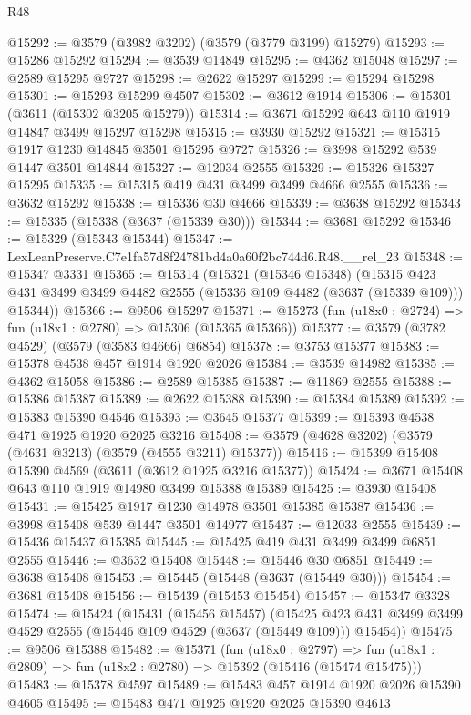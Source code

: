 \begin{lexlean}{R48}
\begin{coremodule}
@15292 := @3579 (@3982 @3202) (@3579 (@3779 @3199) @15279)
@15293 := @15286 @15292
@15294 := @3539 @14849
@15295 := @4362 @15048
@15297 := @2589 @15295 @9727
@15298 := @2622 @15297
@15299 := @15294 @15298
@15301 := @15293 @15299 @4507
@15302 := @3612 @1914
@15306 := @15301 (@3611 (@15302 @3205 @15279))
@15314 := @3671 @15292 @643 @110 @1919 @14847 @3499 @15297 @15298
@15315 := @3930 @15292
@15321 := @15315 @1917 @1230 @14845 @3501 @15295 @9727
@15326 := @3998 @15292 @539 @1447 @3501 @14844
@15327 := @12034 @2555
@15329 := @15326 @15327 @15295
@15335 := @15315 @419 @431 @3499 @3499 @4666 @2555
@15336 := @3632 @15292
@15338 := @15336 @30 @4666
@15339 := @3638 @15292
@15343 := @15335 (@15338 (@3637 (@15339 @30)))
@15344 := @3681 @15292
@15346 := @15329 (@15343 @15344)
@15347 := LexLeanPreserve.C7e1fa57d8f24781bd4a0a60f2bc744d6.R48.__rel_23
@15348 := @15347 @3331
@15365 := @15314
    (@15321
      (@15346 @15348)
      (@15315 @423 @431 @3499 @3499 @4482 @2555 (@15336 @109 @4482 (@3637 (@15339 @109))) @15344))
@15366 := @9506 @15297
@15371 := @15273 (fun (u18x0 : @2724) => fun (u18x1 : @2780) => @15306 (@15365 @15366))
@15377 := @3579 (@3782 @4529) (@3579 (@3583 @4666) @6854)
@15378 := @3753 @15377
@15383 := @15378 @4538 @457 @1914 @1920 @2026
@15384 := @3539 @14982
@15385 := @4362 @15058
@15386 := @2589 @15385
@15387 := @11869 @2555
@15388 := @15386 @15387
@15389 := @2622 @15388
@15390 := @15384 @15389
@15392 := @15383 @15390 @4546
@15393 := @3645 @15377
@15399 := @15393 @4538 @471 @1925 @1920 @2025 @3216
@15408 := @3579 (@4628 @3202) (@3579 (@4631 @3213) (@3579 (@4555 @3211) @15377))
@15416 := @15399 @15408 @15390 @4569 (@3611 (@3612 @1925 @3216 @15377))
@15424 := @3671 @15408 @643 @110 @1919 @14980 @3499 @15388 @15389
@15425 := @3930 @15408
@15431 := @15425 @1917 @1230 @14978 @3501 @15385 @15387
@15436 := @3998 @15408 @539 @1447 @3501 @14977
@15437 := @12033 @2555
@15439 := @15436 @15437 @15385
@15445 := @15425 @419 @431 @3499 @3499 @6851 @2555
@15446 := @3632 @15408
@15448 := @15446 @30 @6851
@15449 := @3638 @15408
@15453 := @15445 (@15448 (@3637 (@15449 @30)))
@15454 := @3681 @15408
@15456 := @15439 (@15453 @15454)
@15457 := @15347 @3328
@15474 := @15424
    (@15431
      (@15456 @15457)
      (@15425 @423 @431 @3499 @3499 @4529 @2555 (@15446 @109 @4529 (@3637 (@15449 @109))) @15454))
@15475 := @9506 @15388
@15482 := @15371
    (fun (u18x0 : @2797) =>
    fun (u18x1 : @2809) => fun (u18x2 : @2780) => @15392 (@15416 (@15474 @15475)))
@15483 := @15378 @4597
@15489 := @15483 @457 @1914 @1920 @2026 @15390 @4605
@15495 := @15483 @471 @1925 @1920 @2025 @15390 @4613

\end{coremodule}
\end{lexlean}
